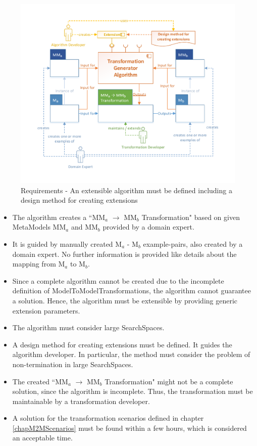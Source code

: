 \begin{figure}[ht!]
	\centering
	\includegraphics[scale=0.8, trim=0.5cm 1cm 0.5cm 1cm, clip=true]{Images/Requirements.pdf}
	\caption{Requirements - An extensible algorithm must be defined including a design method for creating extensions}
	\label{figRequirements}
\end{figure}

\begin{itemize}
	\item The algorithm creates a ``MM$_a$ $\rightarrow$ MM$_b$ Transformation" based on given \glspl{MetaModel} MM$_a$ and MM$_b$ provided by a domain expert. 
	\item It is guided by manually created M$_a$ - M$_b$ example-pairs, also created by a domain expert. No further information is provided like details about the mapping from M$_a$ to M$_b$.
	\item Since a complete algorithm cannot be created due to the incomplete definition of \glspl{ModelToModelTransformation}, the algorithm cannot guarantee a solution. Hence, the algorithm must be extensible by providing generic extension parameters.
	\item The algorithm must consider large \glspl{SearchSpace}.
	\item A design method for creating extensions must be defined. It guides the algorithm developer. In particular, the method must consider the problem of non-termination in large \glspl{SearchSpace}.
	\item The created ``MM$_a$ $\rightarrow$ MM$_b$ Transformation" might not be a complete solution, since the algorithm is incomplete. Thus, the transformation must be maintainable by a transformation developer.
	\item A solution for the transformation scenarios defined in chapter \ref{chapM2MScenarios} must be found within a few hours, which is considered an acceptable time.
\end{itemize}

